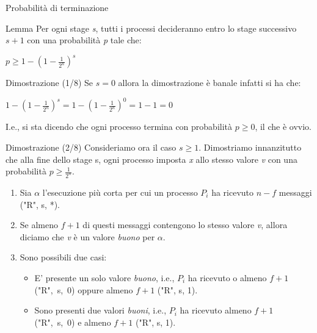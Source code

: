 \documentclass{beamer}
\begin{document}
\begin{frame}{Probabilità di terminazione}
    \begin{block}{Lemma}
        Per ogni stage \textit{s}, tutti i processi decideranno entro lo stage successivo $s+1$ con una probabilità \textit{p} tale che:
        \begin{center}
        \huge
            $p \geq 1 - (1-\frac{1}{2^n})^s$
        \end{center}
    \end{block}
\end{frame}

\begin{frame}{Dimostrazione (1/8)}
    Se $s = 0$ allora la dimostrazione è banale infatti si ha che:
    \vspace{0.3cm}
    \begin{center}
        \Large
        $1 - (1 - \frac{1}{2^n})^s = 1 - (1 - \frac{1}{2^n})^0 = 1 - 1 = 0$
    \end{center}
    \normalsize
    \vspace{0.3cm}
    I.e., si sta dicendo che ogni processo termina con probabilità $p \geq 0$, il che è ovvio.
\end{frame}

\begin{frame}{Dimostrazione (2/8)}
    Consideriamo ora il caso $s \geq 1$. \newline
    Dimostriamo innanzitutto che alla fine dello stage s, ogni processo imposta \textit{x} allo stesso valore \textit{v} con una probabilità $p \geq \frac{1}{2^n}$. 
    \begin{enumerate}
        \item<1-> Sia $\alpha$ l'esecuzione più corta per cui un processo $P_{i}$ ha ricevuto $n - f$ messaggi ("R", s, *).
        \item<2-> Se almeno $f + 1$ di questi messaggi contengono lo stesso valore \textit{v}, allora diciamo che \textit{v} è un valore \textit{buono} per $\alpha$. 
        \item<3-> Sono possibili due casi:
        \begin{itemize}%
            \item E' presente un solo valore \textit{buono}, i.e., $P_{i}$ ha ricevuto o almeno $f + 1$ \mbox{("R", s, 0)} oppure almeno $f + 1$ ("R", s, 1).
            \item Sono presenti due valori \textit{buoni}, i.e., $P_{i}$ ha ricevuto almeno $f + 1$ \mbox{("R", s, 0)} e almeno $f + 1$ ("R", s, 1).
        \end{itemize}
    \end{enumerate}
\end{frame}
\end{document}
